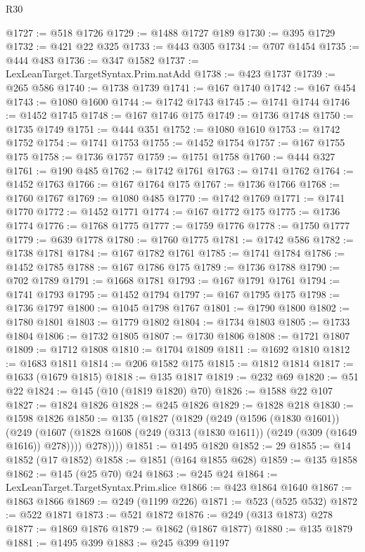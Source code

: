 \begin{lexlean}{R30}
\begin{coremodule}
@1727 := @518 @1726
@1729 := @1488 @1727 @189
@1730 := @395 @1729
@1732 := @421 @22 @325
@1733 := @443 @305
@1734 := @707 @1454
@1735 := @444 @483
@1736 := @347 @1582
@1737 := LexLeanTarget.TargetSyntax.Prim.natAdd
@1738 := @423 @1737
@1739 := @265 @586
@1740 := @1738 @1739
@1741 := @167 @1740
@1742 := @167 @454
@1743 := @1080 @1600
@1744 := @1742 @1743
@1745 := @1741 @1744
@1746 := @1452 @1745
@1748 := @167 @1746 @175
@1749 := @1736 @1748
@1750 := @1735 @1749
@1751 := @444 @351
@1752 := @1080 @1610
@1753 := @1742 @1752
@1754 := @1741 @1753
@1755 := @1452 @1754
@1757 := @167 @1755 @175
@1758 := @1736 @1757
@1759 := @1751 @1758
@1760 := @444 @327
@1761 := @190 @485
@1762 := @1742 @1761
@1763 := @1741 @1762
@1764 := @1452 @1763
@1766 := @167 @1764 @175
@1767 := @1736 @1766
@1768 := @1760 @1767
@1769 := @1080 @485
@1770 := @1742 @1769
@1771 := @1741 @1770
@1772 := @1452 @1771
@1774 := @167 @1772 @175
@1775 := @1736 @1774
@1776 := @1768 @1775
@1777 := @1759 @1776
@1778 := @1750 @1777
@1779 := @639 @1778
@1780 := @1760 @1775
@1781 := @1742 @586
@1782 := @1738 @1781
@1784 := @167 @1782 @1761
@1785 := @1741 @1784
@1786 := @1452 @1785
@1788 := @167 @1786 @175
@1789 := @1736 @1788
@1790 := @702 @1789
@1791 := @1668 @1781
@1793 := @167 @1791 @1761
@1794 := @1741 @1793
@1795 := @1452 @1794
@1797 := @167 @1795 @175
@1798 := @1736 @1797
@1800 := @1045 @1798 @1767
@1801 := @1790 @1800
@1802 := @1780 @1801
@1803 := @1779 @1802
@1804 := @1734 @1803
@1805 := @1733 @1804
@1806 := @1732 @1805
@1807 := @1730 @1806
@1808 := @1721 @1807
@1809 := @1712 @1808
@1810 := @1704 @1809
@1811 := @1692 @1810
@1812 := @1683 @1811
@1814 := @206 @1582 @175
@1815 := @1812 @1814
@1817 := @1633 (@1679 @1815)
@1818 := @135 @1817
@1819 := @232 @69
@1820 := @51 @22
@1824 := @145 (@10 (@1819 @1820) @70)
@1826 := @1588 @22 @107
@1827 := @1824 @1826
@1828 := @245 @1826
@1829 := @1828 @218
@1830 := @1598 @1826
@1850 := @135
    (@1827
      (@1829
        (@249
          (@1596 (@1830 @1601))
          (@249
            (@1607 (@1828 @1608 (@249 (@313 (@1830 @1611)) (@249 (@309 (@1649 @1616)) @278))))
            @278))))
@1851 := @1495 @1820
@1852 := 29
@1855 := @14 @1852 (@17 @1852)
@1858 := @1851 (@164 @1855 @628)
@1859 := @135 @1858
@1862 := @145 (@25 @70) @24
@1863 := @245 @24
@1864 := LexLeanTarget.TargetSyntax.Prim.slice
@1866 := @423 @1864 @1640
@1867 := @1863 @1866
@1869 := @249 (@1199 @226)
@1871 := @523 (@525 @532)
@1872 := @522 @1871
@1873 := @521 @1872
@1876 := @249 (@313 @1873) @278
@1877 := @1869 @1876
@1879 := @1862 (@1867 @1877)
@1880 := @135 @1879
@1881 := @1495 @399
@1883 := @245 @399 @1197

\end{coremodule}
\end{lexlean}
